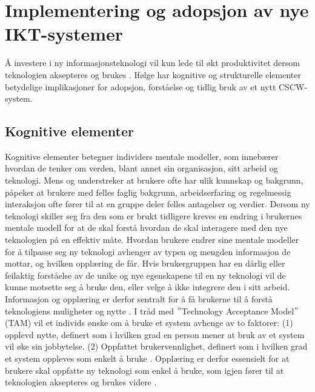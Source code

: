 \section{Implementering og adopsjon av nye IKT-systemer}
\label{sec:implementering}
Å investere i ny informasjonsteknologi vil kun lede til økt produktivitet dersom teknologien aksepteres og brukes \citep{Venkatesh99}. Ifølge \citet{Orlikowski92} har kognitive og strukturelle elementer betydelige implikasjoner for adopsjon, forståelse og tidlig bruk av et nytt CSCW-system. 

\subsection{Kognitive elementer}
\label{sec:kognitive_elementer}
Kognitive elementer betegner individers mentale modeller, som innebærer hvordan de tenker om verden, blant annet sin organisasjon, sitt arbeid og teknologi. Mens \citet{Berg99} og \citet{Ackermann00} understreker at brukere ofte har ulik kunnskap og bakgrunn, påpeker \citet{Orlikowski92} at brukere med felles faglig bakgrunn, arbeidserfaring og regelmessig interaksjon ofte fører til at en gruppe deler felles antagelser og verdier. Dersom ny teknologi skiller seg fra den som er brukt tidligere kreves en endring i brukernes mentale modell for at de skal forstå hvordan de skal interagere med den nye teknologien på en effektiv måte. Hvordan brukere endrer sine mentale modeller for å tilpasse seg ny teknologi avhenger av typen og mengden informasjon de mottar, og hvilken opplæring de får. Hvis brukergruppen har en dårlig eller feilaktig forståelse av de unike og nye egenskapene til en ny teknologi vil de kunne motsette seg å bruke den, eller velge å ikke integrere den i sitt arbeid. Informasjon og opplæring er derfor sentralt for å få brukerne til å forstå teknologiens muligheter og nytte \citep{Orlikowski92}. I tråd med $"$Technology Acceptance Model$"$ (TAM) vil et individs ønske om å bruke et system avhenge av to faktorer: (1) opplevd nytte, definert som i hvilken grad en person mener at bruk av et system vil øke sin jobbytelse. (2) Oppfattet brukervennlighet, definert som i hvilken grad et system oppleves som enkelt å bruke \citep{Venkatesh00}. Opplæring er derfor essensielt for at brukere skal oppfatte ny teknologi som enkel å bruke, som igjen fører til at teknologien aksepteres og brukes videre \citep{Venkatesh99}.

